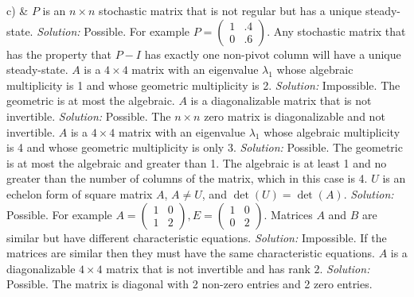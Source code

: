     
c) &  
\ifnum {}         
    $P$ is an $n\times n$ stochastic matrix that is not regular but has a unique steady-state.
    \ifnum {} {\color{DarkBlue} \textit{Solution:  } Possible. For example \setlength{\extrarowheight}{0.0cm}
    $P = \begin{pmatrix} 1&.4\\0&.6\end{pmatrix}$. Any stochastic matrix that has the property that $P-I$ has exactly one non-pivot column will have a unique steady-state. } \fi
\fi
\ifnum {}      
    $A$ is a $4\times 4$ matrix with an eigenvalue $\lambda_1$ whose algebraic multiplicity is 1 and whose geometric multiplicity is 2.
    \ifnum {} {\color{DarkBlue} \textit{Solution:  } Impossible. The geometric is at most the algebraic. } \fi
\fi    
\ifnum {}  
    $A$ is a diagonalizable matrix that is not invertible. 
    \ifnum {} {\color{DarkBlue} \textit{Solution:  } Possible. The $n\times n$ zero matrix is diagonalizable and not invertible. } \fi
\fi    
\ifnum {}    
    $A$ is a $4\times 4$ matrix with an eigenvalue $\lambda_1$ whose algebraic multiplicity is 4 and whose geometric multiplicity is only 3.
    \ifnum {} {\color{DarkBlue} \textit{Solution:  } Possible. The geometric is at most the algebraic and greater than 1. The algebraic is at least 1 and no greater than the number of columns of the matrix, which in this case is 4. } \fi
\fi   
\ifnum {}    
    $U$ is an echelon form of square matrix $A$, $A\ne U$, and $\det(U)=\det(A)$.
    \ifnum {} {\color{DarkBlue} \textit{Solution:  } Possible. \setlength{\extrarowheight}{0.00cm} For example $A = \begin{pmatrix} 1&0\\1&2 \end{pmatrix}, E = \begin{pmatrix} 1&0\\0&2\end{pmatrix}$.  } \fi
\fi    
\ifnum {}      
    Matrices $A$ and $B$ are similar but have different characteristic equations. 
    \ifnum {} {\color{DarkBlue} \textit{Solution:  } Impossible. If the matrices are similar then they must have the same characteristic equations.   } \fi
\fi    
\ifnum {}  
    $A$ is a diagonalizable $4\times 4$ matrix that is not invertible and has rank $2$. 
    \ifnum {} {\color{DarkBlue} \textit{Solution:  } Possible. The matrix is diagonal with 2 non-zero entries and 2 zero entries.} \fi
